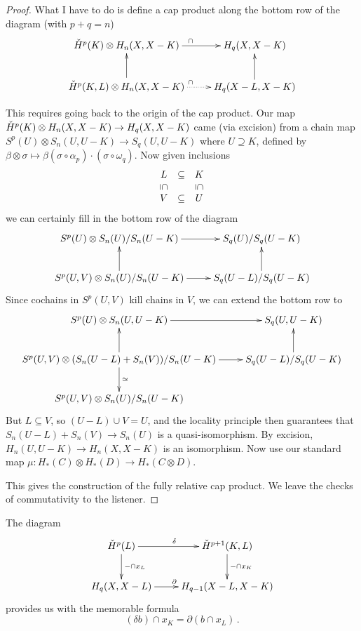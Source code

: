 \begin{proof}
What I have to do is define a cap product along the bottom row of the
diagram (with $p+q=n$)
\begin{equation*}
\xymatrix{
\cHH^p(K)\otimes H_n(X,X-K)\ar[r]^{\cap} & H_q(X,X-K)\\
\cHH^p(K,L)\otimes H_n(X,X-K)\ar[u]\ar@{.>}[r]^{\cap} & H_q(X-L,X-K) \ar[u]
}
\end{equation*}

This requires going back to the origin of the cap product. 
Our map $\check{H}^p(K)\otimes H_n(X,X-K)\to H_q(X,X-K)$ came (via excision)
 from a chain map $S^p(U)\otimes S_n(U,U-K)\to S_q(U,U-K)$ where $U\supseteq K$, defined by $\beta\otimes\sigma\mapsto\beta(\sigma\circ\alpha_p)\cdot(\sigma\circ\omega_q)$. Now given inclusions
\[
\begin{array}{ccc} L & \subseteq & K \\
\downsubseteq & & \downsubseteq \\
V & \subseteq & U
\end{array}
\]
we can certainly fill in the bottom row of the diagram
\begin{equation*}
\xymatrix{
S^p(U)\otimes S_n(U)/S_n(U-K)\ar[r] & S_q(U)/S_q(U-K)\\
S^p(U,V)\otimes S_n(U)/S_n(U-K)\ar[r]\ar[u] & S_q(U-L)/S_q(U-K)\ar[u]
}
\end{equation*}
Since cochains in $S^p(U,V)$ kill chains in $V$, we can extend the bottom
row to 
\begin{equation*}
\xymatrix{
	S^p(U)\otimes S_n(U,U-K)\ar[r] & S_q(U,U-K)\\
	S^p(U,V)\otimes (S_n(U-L)+S_n(V))/S_n(U-K)\ar[r]\ar[d]^{\simeq}\ar[u] & S_q(U-L)/S_q(U-K)\ar[u]\\
	S^p(U,V)\otimes S_n(U)/S_n(U-K) & 
}
\end{equation*}
But $L\subseteq V$, so $(U-L)\cup V=U$, and the locality principle then
guarantees that $S_n(U-L)+S_n(V)\to S_n(U)$ is a quasi-isomorphism. 
By excision, $H_n(U,U-K)\to H_n(X,X-K)$ is an isomorphism. Now use
our standard map $\mu:H_*(C)\otimes H_*(D)\to H_*(C\otimes D)$. 

This gives the construction of the fully relative cap product. 
We leave the checks of commutativity to the listener.
\end{proof}

The diagram
\begin{equation*}
\xymatrix{
	\cHH^p(L)\ar[r]^\delta\ar[d]^{-\cap x_L} & \cHH^{p+1}(K,L)\ar[d]^{-\cap x_K}\\
	H_q(X,X-L)\ar[r]^{\partial} & H_{q-1}(X-L,X-K)
}
\end{equation*}
provides us with the memorable formula
\begin{equation*}
(\delta b)\cap x_K=\partial(b\cap x_L)\,.
\end{equation*}

